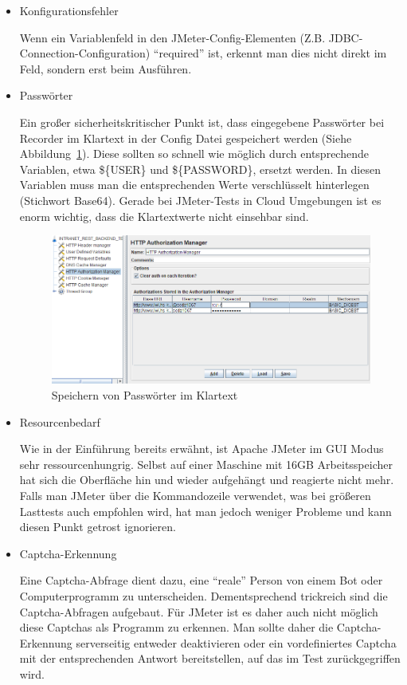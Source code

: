 \documentclass[a4paper,12pt]{article}
\begin{document}
\begin{itemize}
	\item Konfigurationsfehler
	
	Wenn ein Variablenfeld in den JMeter-Config-Elementen (Z.B. JDBC-Connection-Configuration) "`required"' ist, erkennt man dies nicht direkt im Feld, sondern erst beim Ausführen.
	
	\item Passwörter
	
	Ein großer sicherheitskritischer Punkt ist, dass eingegebene Passwörter bei Recorder im Klartext in der Config Datei gespeichert werden (Siehe Abbildung~\ref{fig:password}). Diese sollten so schnell wie möglich durch entsprechende Variablen, etwa \$\{USER\} und \$\{PASSWORD\}, ersetzt werden. In diesen Variablen muss man die entsprechenden Werte verschlüsselt hinterlegen (Stichwort Base64).
Gerade bei JMeter-Tests in Cloud Umgebungen ist es enorm wichtig, dass die Klartextwerte nicht einsehbar sind.  

	\begin{figure}[htb]%
 \centering
    \includegraphics[width=1\textwidth]{bilder/password.png}
  \caption{Speichern von Passwörter im Klartext}
  \label{fig:password}
\end{figure}

	\item Resourcenbedarf
	
	Wie in der Einführung bereits erwähnt, ist Apache JMeter im GUI Modus sehr ressourcenhungrig. Selbst auf einer Maschine mit 16GB Arbeitsspeicher hat sich die Oberfläche hin und wieder aufgehängt und reagierte nicht mehr. Falls man JMeter über die Kommandozeile verwendet, was bei größeren Lasttests auch empfohlen wird, hat man jedoch weniger Probleme und kann diesen Punkt getrost ignorieren.

\item Captcha-Erkennung

Eine Captcha-Abfrage dient dazu, eine "`reale"' Person von einem Bot oder Computerprogramm zu unterscheiden. Dementsprechend trickreich sind die Captcha-Abfragen aufgebaut. Für JMeter ist es daher auch nicht möglich diese Captchas als Programm zu erkennen. Man sollte daher die Captcha-Erkennung serverseitig entweder deaktivieren oder ein vordefiniertes Captcha mit der entsprechenden Antwort bereitstellen, auf das im Test zurückgegriffen wird.

\end{itemize}
\end{document}
